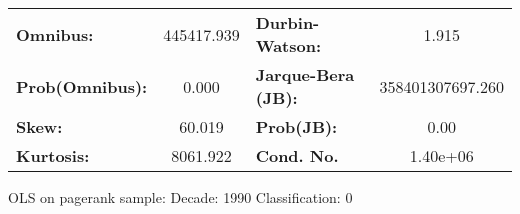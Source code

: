 \begin{center}
\begin{tabular}{lccccc}
\bottomrule
\end{tabular}
\begin{tabular}{lclc}
\textbf{Omnibus:}       & 445417.939 & \textbf{  Durbin-Watson:     } &        1.915      \\
\textbf{Prob(Omnibus):} &    0.000   & \textbf{  Jarque-Bera (JB):  } & 358401307697.260  \\
\textbf{Skew:}          &   60.019   & \textbf{  Prob(JB):          } &         0.00      \\
\textbf{Kurtosis:}      &  8061.922  & \textbf{  Cond. No.          } &     1.40e+06      \\
\bottomrule
\end{tabular}
\end{center}
\break
OLS on pagerank sample: Decade: 1990 Classification: 0
